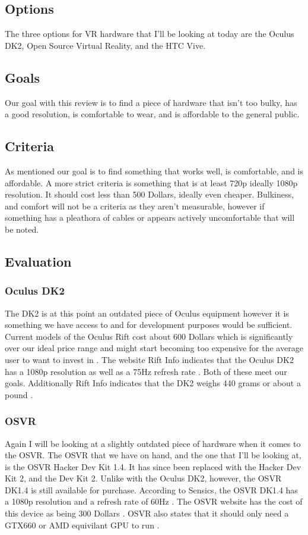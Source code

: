 \documentclass{article}
\begin{document}
\subsection{Options}
The three options for VR hardware that I'll be looking at today are the Oculus DK2, Open Source Virtual Reality, and the HTC Vive. 

\subsection{Goals}
Our goal with this review is to find a piece of hardware that isn't too bulky, has a good resolution, is comfortable to wear, and is affordable to the general public.

\subsection{Criteria}
As mentioned our goal is to find something that works well, is comfortable, and is affordable. 
A more strict criteria is something that is at least 720p ideally 1080p resolution.
It should cost less than 500 Dollars, ideally even cheaper.
Bulkiness, and comfort will not be a criteria as they aren't measurable, however if something has a pleathora of cables or appears actively uncomfortable that will be noted.

\subsection{Evaluation}
\subsubsection{Oculus DK2}
The DK2 is at this point an outdated piece of Oculus equipment however it is something we have access to and for development purposes would be sufficient. 
Current models of the Oculus Rift cost about 600 Dollars which is significantly over our ideal price range and might start becoming too expensive for the average user to want to invest in \cite{oculushardware}. 
The website Rift Info indicates that the Oculus DK2 has a 1080p resolution as well as a 75Hz refresh rate \cite{riftinfo}.
Both of these meet our goals.
Additionally Rift Info indicates that the DK2 weighs 440 grams or about a pound \cite{riftinfo}.

\subsubsection{OSVR}
Again I will be looking at a slightly outdated piece of hardware when it comes to the OSVR. 
The OSVR that we have on hand, and the one that I'll be looking at, is the OSVR Hacker Dev Kit 1.4. 
It has since been replaced with the Hacker Dev Kit 2, and the Dev Kit 2.
Unlike with the Oculus DK2, however, the OSVR DK1.4 is still available for purchase.
According to Sensics, the OSVR DK1.4 has a 1080p resolution and a refresh rate of 60Hz \cite{sensicsosvr}.
The OSVR website has the cost of this device as being 300 Dollars \cite{osvrhardware}.
OSVR also states that it should only need a GTX660 or AMD equivilant GPU to run \cite{osvrhardware}.
\end{document}
